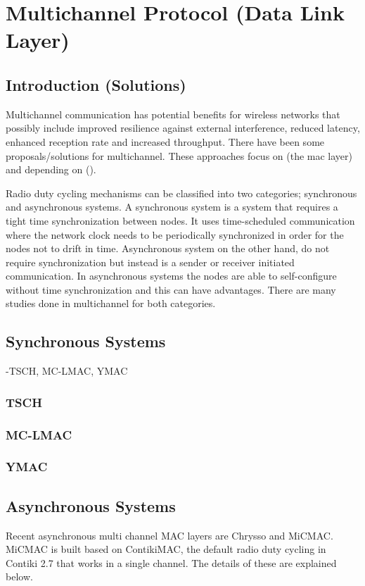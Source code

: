 \section{Multichannel Protocol (Data Link Layer)}
\subsection{Introduction (Solutions)}
Multichannel communication has potential benefits for wireless networks that possibly include improved resilience against external interference, reduced latency, enhanced reception rate and increased throughput. 
There have been some proposals/solutions for multichannel. These approaches focus on (the mac layer) and depending on ().

Radio duty cycling mechanisms can be classified into two categories; synchronous and asynchronous systems. A synchronous system is a system that requires a tight time synchronization between nodes. It uses time-scheduled communication where the network clock needs to be periodically synchronized in order for the nodes not to drift in time. Asynchronous system on the other hand, do not require synchronization but instead is a sender or receiver initiated communication. In asynchronous systems the nodes are able to self-configure without time synchronization and this can have advantages. There are many studies done in multichannel for both categories.

\subsection{Synchronous Systems}
-TSCH, MC-LMAC, YMAC

\subsubsection{TSCH}

\subsubsection{MC-LMAC}

\subsubsection{YMAC}

\subsection{Asynchronous Systems}
Recent asynchronous multi channel MAC layers are Chrysso and MiCMAC. MiCMAC is built based on ContikiMAC, the default radio duty cycling in Contiki 2.7 that works in a single channel. The details of these are explained below.

